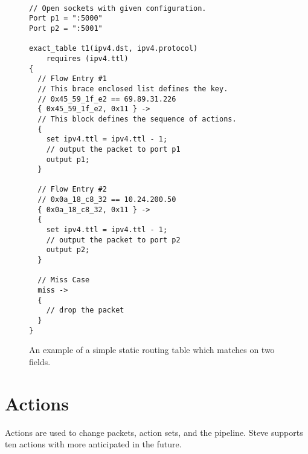 \begin{figure}
\begin{lstlisting}

// Open sockets with given configuration.
Port p1 = ":5000"
Port p2 = ":5001"

exact_table t1(ipv4.dst, ipv4.protocol)
	requires (ipv4.ttl)
{
  // Flow Entry #1
  // This brace enclosed list defines the key.
  // 0x45_59_1f_e2 == 69.89.31.226
  { 0x45_59_1f_e2, 0x11 } ->
  // This block defines the sequence of actions.
  {
    set ipv4.ttl = ipv4.ttl - 1;
    // output the packet to port p1
    output p1;
  }
  
  // Flow Entry #2
  // 0x0a_18_c8_32 == 10.24.200.50
  {	0x0a_18_c8_32, 0x11 } ->
  {
    set ipv4.ttl = ipv4.ttl - 1;
    // output the packet to port p2
    output p2;
  }
  
  // Miss Case
  miss ->
  {
    // drop the packet
  }
}
\end{lstlisting}
\caption{An example of a simple static routing table which matches on two fields.}
\label{fg:basic_table_ex}
\end{figure}


\section{Actions} \label{action_tut}

Actions are used to change packets, action sets, and the pipeline. Steve supports ten actions with more anticipated in the future.

